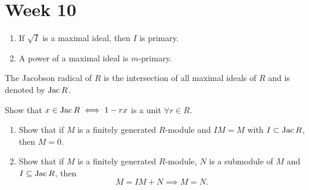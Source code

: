 
\section{Week 10}

\begin{exercise} \mbox{}
  \begin{enumerate}
    \item If $\sqrt{I}$ is a maximal ideal, then $I$ is primary.
    \item A power of a maximal ideal is $m$-primary.
  \end{enumerate}
\end{exercise}

\begin{exercise}
  \begin{definition}
    The Jacobson radical of $R$ is the intersection of all maximal ideals
    of $R$ and is denoted by $\operatorname{Jac} R$.
  \end{definition}
  Show that $x \in \operatorname{Jac} R \iff 1 - rx$ is a unit $\forall r \in R$.
\end{exercise}

\begin{exercise} \mbox{}
  \begin{enumerate}
    \item Show that if $M$ is a finitely generated $R$-module and $IM = M$
      with $I \subset \operatorname{Jac}  R$, then $M = 0$.
    \item Show that if $M$ is a finitely generated $R$-module, $N$ is a
      submodule of $M$ and $I\subseteq \operatorname{Jac} R$, then
      \[ M = IM + N \implies M = N. \]
  \end{enumerate}
\end{exercise}
